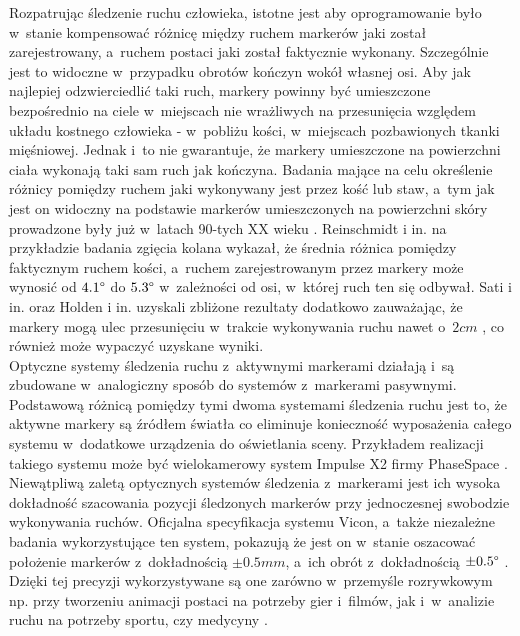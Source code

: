 Rozpatrując śledzenie ruchu człowieka, istotne jest aby oprogramowanie było w~stanie kompensować różnicę między ruchem markerów jaki został zarejestrowany, a~ruchem postaci jaki został faktycznie wykonany. Szczególnie jest to widoczne w~przypadku obrotów kończyn wokół własnej osi. Aby jak najlepiej odzwierciedlić taki ruch, markery powinny być umieszczone bezpośrednio na ciele w~miejscach nie wrażliwych na przesunięcia względem układu kostnego człowieka - w~pobliżu kości, w~miejscach pozbawionych tkanki mięśniowej. Jednak i~to nie gwarantuje, że markery umieszczone na powierzchni ciała wykonają taki sam ruch jak kończyna. Badania mające na celu określenie różnicy pomiędzy ruchem jaki wykonywany jest przez kość lub staw, a~tym jak jest on widoczny na podstawie markerów umieszczonych na powierzchni skóry prowadzone były już w~latach 90-tych XX wieku \cite{Sati2016,Reinschmidt2016,Holden2016}. Reinschmidt i in. \cite{Reinschmidt2016} na przykładzie badania zgięcia kolana wykazał, że średnia różnica pomiędzy faktycznym ruchem kości, a~ruchem zarejestrowanym przez markery może wynosić od $4.1\degree$ do $5.3\degree$ w~zależności od osi, w~której ruch ten się odbywał. Sati i in. \cite{Sati2016} oraz Holden i in. \cite{Holden2016} uzyskali zbliżone rezultaty dodatkowo zauważając, że markery mogą ulec przesunięciu w~trakcie wykonywania ruchu nawet o~$2cm$ \cite{Sati2016}, co również może wypaczyć uzyskane wyniki.\\ 
			
Optyczne systemy śledzenia ruchu z~aktywnymi markerami działają i~są zbudowane w~analogiczny sposób do systemów z~markerami pasywnymi. Podstawową różnicą pomiędzy tymi dwoma systemami śledzenia ruchu jest to, że aktywne markery są źródłem światła co eliminuje konieczność wyposażenia całego systemu w~dodatkowe urządzenia do oświetlania sceny. Przykładem realizacji takiego systemu może być wielokamerowy system Impulse X2 firmy PhaseSpace .\\
			
Niewątpliwą zaletą optycznych systemów śledzenia z~markerami jest ich wysoka dokładność szacowania pozycji śledzonych markerów przy jednoczesnej swobodzie wykonywania ruchów. Oficjalna specyfikacja systemu Vicon, a~także niezależne badania wykorzystujące ten system, pokazują że jest on w~stanie oszacować położenie markerów z~dokładnością $\pm0.5mm$, a~ich obrót z~dokładnością $\pm0.5 \degree$  \cite{Windolf2008}. Dzięki tej precyzji wykorzystywane są one zarówno w~przemyśle rozrywkowym np. przy tworzeniu animacji postaci na potrzeby gier i~filmów, jak i~w~analizie ruchu na potrzeby sportu, czy medycyny . 
			

